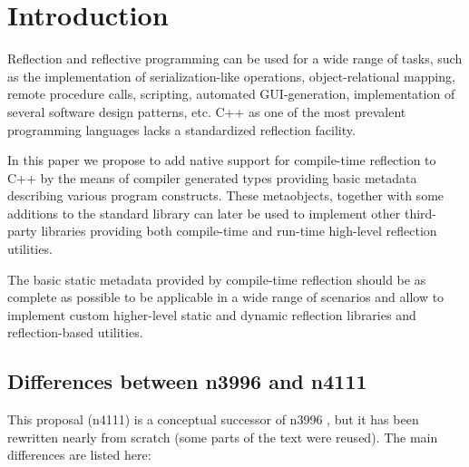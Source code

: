 \section{Introduction}

Reflection and reflective programming can be used
for a wide range of tasks, such as the implementation
of serialization-like operations, object-relational mapping,
remote procedure calls, scripting, automated GUI-generation,
implementation of several software design patterns, etc.
C++ as one of the most prevalent programming languages 
lacks a standardized reflection facility.

In this paper we propose to add native support for
compile-time reflection to C++ by the means of compiler generated
types providing basic metadata describing various program constructs.
These metaobjects, together with some additions to the standard
library can later be used to implement other third-party libraries
providing both compile-time and run-time high-level
reflection utilities.

The basic static metadata provided by compile-time reflection
should be as complete as possible to be applicable in a wide
range of scenarios and allow to implement custom higher-level
static and dynamic reflection libraries and reflection-based
utilities.

\subsection{Differences between n3996 and n4111}

This proposal (n4111) is a conceptual successor of n3996 \cite{n3996}, but it has
been rewritten nearly from scratch (some parts of the text were reused).
The main differences are listed here:

